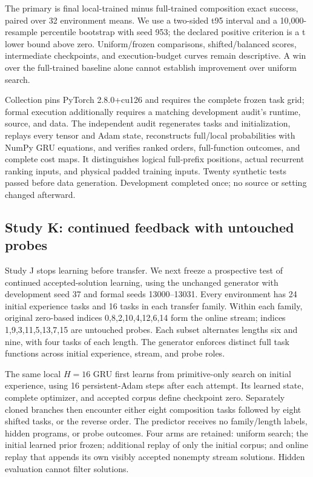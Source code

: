 \documentclass[11pt]{article}
\begin{document}
The primary is final local-trained minus full-trained composition exact
success, paired over 32 environment means. We use a two-sided t95 interval
and a 10,000-resample percentile bootstrap with seed 953; the declared
positive criterion is a t lower bound above zero. Uniform/frozen comparisons,
shifted/balanced scores, intermediate checkpoints, and execution-budget
curves remain descriptive. A win over the full-trained baseline alone cannot
establish improvement over uniform search.

Collection pins PyTorch 2.8.0+cu126 and requires the complete frozen task grid;
formal execution additionally requires a matching development audit's runtime,
source, and data. The independent audit regenerates tasks and initialization,
replays every tensor and Adam state, reconstructs full/local probabilities
with NumPy GRU equations, and verifies ranked orders, full-function outcomes,
and complete cost maps. It distinguishes logical full-prefix positions,
actual recurrent ranking inputs, and physical padded training inputs.
Twenty synthetic tests passed before data generation. Development completed
once; no source or setting changed afterward.

\subsection{Study K: continued feedback with untouched probes}
Study J stops learning before transfer. We next freeze a prospective test of
continued accepted-solution learning, using the unchanged generator with
development seed 37 and formal seeds 13000--13031. Every environment has 24
initial experience tasks and 16 tasks in each transfer family. Within each
family, original zero-based indices 0,8,2,10,4,12,6,14 form the online stream;
indices 1,9,3,11,5,13,7,15 are untouched probes. Each subset alternates lengths
six and nine, with four tasks of each length. The generator enforces distinct
full task functions across initial experience, stream, and probe roles.

The same local $H=16$ GRU first learns from primitive-only search on initial
experience, using 16 persistent-Adam steps after each attempt. Its learned
state, complete optimizer, and accepted corpus define checkpoint zero.
Separately cloned branches then encounter either eight composition tasks
followed by eight shifted tasks, or the reverse order. The predictor receives
no family/length labels, hidden programs, or probe outcomes. Four arms are
retained: uniform search; the initial learned prior frozen; additional replay
of only the initial corpus; and online replay that appends its own visibly
accepted nonempty stream solutions. Hidden evaluation cannot filter solutions.
\end{document}
